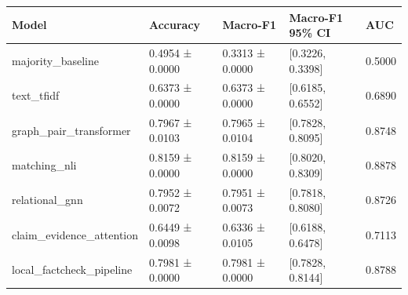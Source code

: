 \begin{tabular}{lllll}
\toprule
Model & Accuracy & Macro-F1 & Macro-F1 95\% CI & AUC \\
\midrule
majority\_baseline & 0.4954 ± 0.0000 & 0.3313 ± 0.0000 & [0.3226, 0.3398] & 0.5000 \\
text\_tfidf & 0.6373 ± 0.0000 & 0.6373 ± 0.0000 & [0.6185, 0.6552] & 0.6890 \\
graph\_pair\_transformer & 0.7967 ± 0.0103 & 0.7965 ± 0.0104 & [0.7828, 0.8095] & 0.8748 \\
matching\_nli & 0.8159 ± 0.0000 & 0.8159 ± 0.0000 & [0.8020, 0.8309] & 0.8878 \\
relational\_gnn & 0.7952 ± 0.0072 & 0.7951 ± 0.0073 & [0.7818, 0.8080] & 0.8726 \\
claim\_evidence\_attention & 0.6449 ± 0.0098 & 0.6336 ± 0.0105 & [0.6188, 0.6478] & 0.7113 \\
local\_factcheck\_pipeline & 0.7981 ± 0.0000 & 0.7981 ± 0.0000 & [0.7828, 0.8144] & 0.8788 \\
\bottomrule
\end{tabular}
